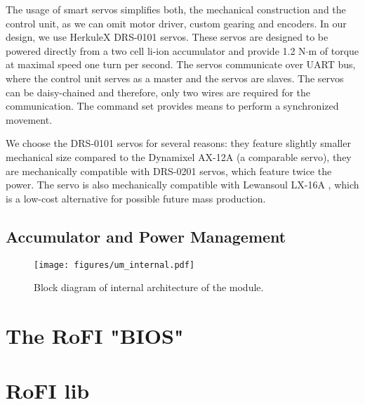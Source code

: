 The usage of smart servos simplifies both, the mechanical construction and the
control unit, as we can omit motor driver, custom gearing and encoders. In our
design, we use HerkuleX DRS-0101 \cite{noauthor_herkulex_nodate} servos. These
servos are designed to be powered directly from a two cell li-ion accumulator
and provide 1.2 N$\cdot$m of torque at maximal speed one turn per second. The
servos communicate over UART bus, where the control unit serves as a master and
the servos are slaves. The servos can be daisy-chained and therefore, only two
wires are required for the communication. The command set provides means to
perform a synchronized movement.

We choose the DRS-0101 servos for several reasons: they feature slightly smaller
mechanical size compared to the Dynamixel AX-12A \cite{noauthor_dynamixel_2006}
(a comparable servo), they are mechanically compatible with DRS-0201
\cite{noauthor_herkulex_nodate} servos, which feature twice the power. The servo
is also mechanically compatible with Lewansoul LX-16A
\cite{noauthor_lx-16a_2018}, which is a low-cost alternative for possible future
mass production.

\subsection{Accumulator and Power Management}



\begin{figure}
    \centering
    \texttt{[image: figures/um\_internal.pdf]}
    \caption{Block diagram of internal architecture of the module.}
    \label{fig:um_internal}
\end{figure}


\section{The RoFI "BIOS" }

\section{RoFI lib}

